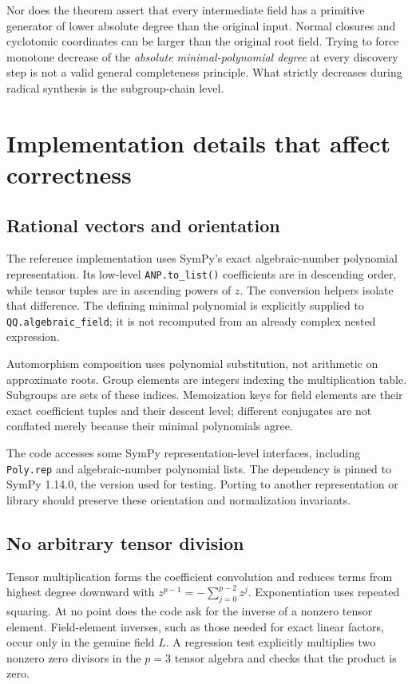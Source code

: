 \documentclass[11pt]{article}
\theoremstyle{definition}\newtheorem{definition}[theorem]{Definition}
\theoremstyle{remark}\newtheorem{remark}[theorem]{Remark}
\newcommand{\code}[1]{\texttt{#1}}
\begin{document}
Nor does the theorem assert that every intermediate field has a primitive
generator of lower absolute degree than the original input. Normal closures
and cyclotomic coordinates can be larger than the original root field. Trying
to force monotone decrease of the \emph{absolute minimal-polynomial degree} at
every discovery step is not a valid general completeness principle. What
strictly decreases during radical synthesis is the subgroup-chain level.

\section{Implementation details that affect correctness}\label{sec:implementation}

\subsection{Rational vectors and orientation}

The reference implementation uses SymPy's exact algebraic-number polynomial
representation. Its low-level \code{ANP.to\_list()} coefficients are in
descending order, while tensor tuples are in ascending powers of $z$. The
conversion helpers isolate that difference. The defining minimal polynomial
is explicitly supplied to \code{QQ.algebraic\_field}; it is not recomputed from
an already complex nested expression.

Automorphism composition uses polynomial substitution, not arithmetic on
approximate roots. Group elements are integers indexing the multiplication
table. Subgroups are sets of these indices. Memoization keys for field elements
are their exact coefficient tuples and their descent level; different
conjugates are not conflated merely because their minimal polynomials agree.

The code accesses some SymPy representation-level interfaces, including
\code{Poly.rep} and algebraic-number polynomial lists. The dependency is pinned
to SymPy 1.14.0, the version used for testing. Porting to another representation
or library should preserve these orientation and normalization invariants.

\subsection{No arbitrary tensor division}

Tensor multiplication forms the coefficient convolution and reduces terms
from highest degree downward with $z^{p-1}=-\sum_{j=0}^{p-2}z^j$.
Exponentiation uses repeated squaring. At no point does the code ask for the
inverse of a nonzero tensor element. Field-element inverses, such as those
needed for exact linear factors, occur only in the genuine field $L$.
A regression test explicitly multiplies two nonzero zero divisors in the
$p=3$ tensor algebra and checks that the product is zero.
\end{document}
